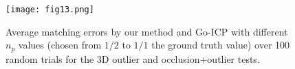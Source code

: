 \documentclass[11pt,bezier,]{article}
\begin{document}
\begin{figure}[!h]
\centering

\texttt{[image: fig13.png]}


% 
%     
\caption{
Average  matching errors by our method 
and Go-ICP with different $n_p$ values (chosen from $1/2$ to $1/1$ the ground truth value)
over 100 random trials
for the 3D outlier and occlusion+outlier tests.
\label{3D_simi_sta}}
\end{figure}
\end{document}
